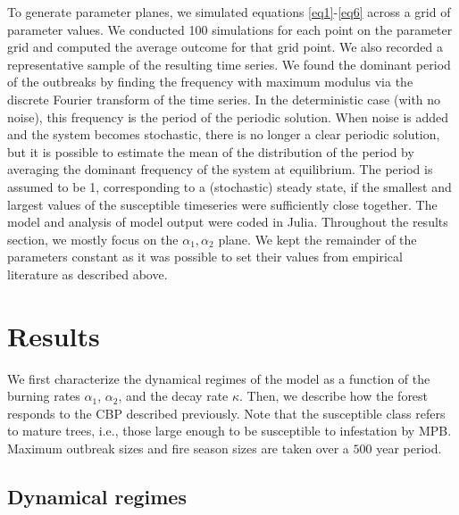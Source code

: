To generate parameter planes, we simulated equations \ref{eq1}-\ref{eq6} across a grid of parameter values.  We conducted 100 simulations for each point on the parameter grid and computed the average outcome for that grid point.  We also recorded a representative sample of the resulting time series. We found the dominant period of the outbreaks by finding the frequency with maximum modulus via the discrete Fourier transform of the time series. In the deterministic case (with no noise), this frequency is the period of the periodic solution. When noise is added and the system becomes stochastic, there is no longer a clear periodic solution, but it is possible to estimate the mean of the distribution of the period by averaging the dominant frequency of the system at equilibrium. The period is assumed to be 1, corresponding to a (stochastic) steady state, if the smallest and largest values of the susceptible timeseries were sufficiently close together. The model and analysis of model output were coded in Julia. Throughout the results section, we mostly focus on the $\alpha_1,\alpha_2$ plane. We kept the remainder of the parameters constant as it was possible to set their values from empirical literature as described above.

\section{Results}
We first characterize the dynamical regimes of the model as a function of the burning rates $\alpha_1$, $\alpha_2$, and the decay rate $\kappa$. Then, we describe how the forest responds to the CBP described previously. Note that the susceptible class refers to mature trees, i.e., those large enough to be susceptible to infestation by MPB. Maximum outbreak sizes and fire season sizes are taken over a $500$ year period.

\subsection{Dynamical regimes}

